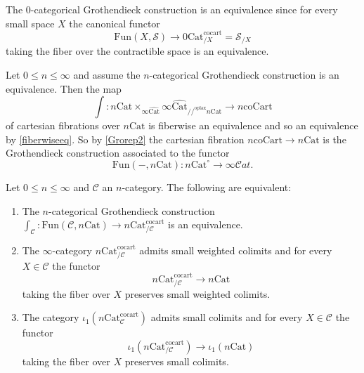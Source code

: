 \documentclass[10pt,oneside]{article}
\numberwithin{equation}{section} %
\numberwithin{figure}{section} %
\theoremstyle{plain}
\theoremstyle{definition}
\newcommand{\mC}{{\mathcal C}}
\newcommand{\mS}{{\mathcal S}}
\newcommand{\Cat}{\mathrm{Cat}}
\newcommand{\Fun}{\mathrm{Fun}}
\newcommand{\cocart}{{\mathrm{cocart}}}
\newcommand{\oplax}{{\mathrm{oplax}}}
\newcommand{\coCart}{{\mathrm{coCart}}}
\newcommand{\scat}{\mathcal{C}\mathit{at}}
\begin{document}
\begin{example}\label{Gro0}

The 0-categorical Grothendieck construction is an equivalence since 
for every small space $X$ the canonical functor
$$\Fun(X, \mS) \to {0\Cat}^\cocart_{/X} = \mS_{/X} $$
taking the fiber over the contractible space is an equivalence.

\end{example}

\begin{remark}\label{clas}
Let $ 0 \leq n \leq \infty$ and assume the $n$-categorical Grothendieck construction is an equivalence.
Then the map $$\int: n\Cat \times_{\infty\widehat{\Cat}} \infty\widehat{\Cat}_{//^\oplax n\Cat} \to {n\coCart}$$ of cartesian fibrations over $n\Cat$ is fiberwise an equivalence and so an 
equivalence by \cref{fiberwiseeq}.
So by \cref{Grorep2} the cartesian fibration
$ {n\coCart} \to n\Cat$ is the Grothendieck construction associated to the functor $$\Fun(-,n\Cat): n\Cat^\circ \to \infty\scat.$$

\end{remark}

\begin{proposition}\label{Grothendieck-char}
Let $ 0 \leq n \leq \infty$ and $\mC$ an $n$-category. The following are equivalent:

\begin{enumerate}[\normalfont(1)]\setlength{\itemsep}{-2pt}

\item The $n$-categorical Grothendieck construction $\int_\mC: \Fun(\mC,n\Cat) \to n\Cat^\cocart_{/\mC} $ is an equivalence.

\item The $\infty$-category $ n\Cat^\cocart_{/\mC}$ admits small weighted colimits and for every
$X \in \mC$ the functor $$ n\Cat^\cocart_{/\mC} \to n\Cat$$
taking the fiber over $X$ preserves small weighted colimits.

\item The category $\iota_1(n\Cat^\cocart_\mC)$ admits small colimits and for every
$X \in \mC$ the functor $$ \iota_1(n\Cat^\cocart_{/\mC}) \to \iota_1(n\Cat) $$ taking the fiber over $X$ preserves small colimits.
    
\end{enumerate}
    
\end{proposition}
\end{document}
